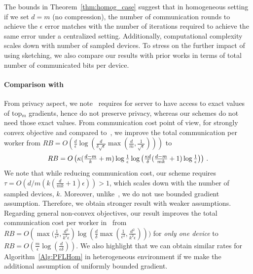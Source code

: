 \documentclass{article} %
\newcommand*{\Resize}[2]{\resizebox{#1}{!}{$#2$}}%
\begin{document}
The bounds in Theorem~\ref{thm:homog_case} suggest that in homogeneous setting if we set $d=m$ (no compression), the number of communication rounds to achieve the $\epsilon$ error matches with the number of iterations required to achieve the same error under a centralized setting. 
Additionally, computational complexity scales down with number of sampled devices. 
To stress on the further impact of using sketching, we also compare our results with prior works in terms of total number of communicated bits per device.

\paragraph{Comparison with~\cite{ivkin2019communication}}
From privacy aspect, we note~\cite{ivkin2019communication} requires for server to have access to exact values of top$_m$ gradients, hence do not preserve privacy, whereas our schemes do not need those exact values. From communication cost point of view, for strongly convex objective and compared to~\cite{ivkin2019communication}, we improve the total communication per worker from 
$RB=O\left(\frac{ d}{\epsilon}\log\left(\frac{d}{\delta\sqrt{\epsilon}}\max\left(\frac{ d}{m},\frac{1}{\sqrt{\epsilon}}\right)\right)\right)$ to 
\[ \Resize{8cm}{RB=O\left(\kappa(\frac{d-m}{k}+m)\log\frac{1}{\epsilon}\log\left(\frac{\kappa d}{\delta}(\frac{d-m}{mk}+1)\log\frac{1}{\epsilon}\right)\right)}\ .\]
We note that while reducing communication cost, our scheme requires $\tau=O(d/m(k(\frac{ d}{mk}+1)\epsilon))>1$, which scales down with the number of sampled devices, $k$. 
Moreover, unlike~\cite{ivkin2019communication}, we do not use bounded gradient assumption. 
Therefore, we obtain stronger result with weaker assumptions. 
Regarding general non-convex objectives, our result improves the total communication cost per worker in~\cite{ivkin2019communication} from $RB=O\left(\max(\frac{1}{\epsilon^2},\frac{d^2}{k^2\epsilon}\right)\log(\frac{d}{\delta}\max(\frac{1}{\epsilon^2},\frac{d^2}{k^2\epsilon})))$ for \emph{only one device} to $RB=O(\frac{m}{\epsilon}\log(\frac{d}{\epsilon\delta}))$. 
We also highlight that we can obtain similar rates for Algorithm~\ref{Alg:PFLHom} in heterogeneous environment if we make the additional assumption of uniformly bounded gradient.
\end{document}
